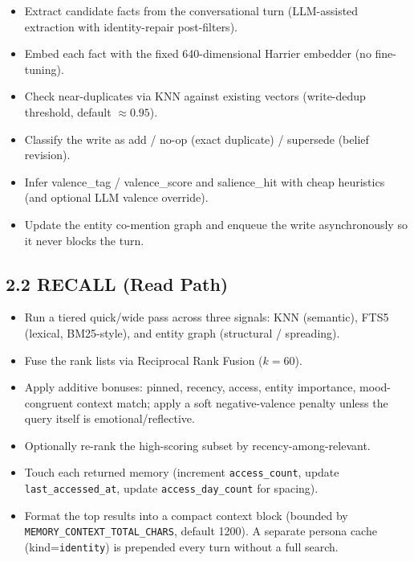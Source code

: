 \documentclass[]{article}
\begin{document}
\begin{itemize}
\item Extract candidate facts from the conversational turn (LLM-assisted
  extraction with identity-repair post-filters).
\item Embed each fact with the fixed 640-dimensional Harrier embedder
  (no fine-tuning).
\item Check near-duplicates via KNN against existing vectors (write-dedup
  threshold, default \(\approx 0.95\)).
\item Classify the write as add / no-op (exact duplicate) / supersede
  (belief revision).
\item Infer valence\_tag / valence\_score and salience\_hit with cheap
  heuristics (and optional LLM valence override).
\item Update the entity co-mention graph and enqueue the write
  asynchronously so it never blocks the turn.
\end{itemize}

\hypertarget{recall-read-path}{%
\subsection{\texorpdfstring{\textbf{2.2 RECALL (Read
Path)}}{2.2 RECALL (Read Path)}}\label{recall-read-path}}

\begin{itemize}
\item Run a tiered quick/wide pass across three signals: KNN (semantic),
  FTS5 (lexical, BM25-style), and entity graph (structural / spreading).
\item Fuse the rank lists via Reciprocal Rank Fusion (\(k=60\)).
\item Apply additive bonuses: pinned, recency, access, entity importance,
  mood-congruent context match; apply a soft negative-valence penalty
  unless the query itself is emotional/reflective.
\item Optionally re-rank the high-scoring subset by recency-among-relevant.
\item Touch each returned memory (increment \texttt{access\_count}, update
  \texttt{last\_accessed\_at}, update \texttt{access\_day\_count} for spacing).
\item Format the top results into a compact context block (bounded by
  \texttt{MEMORY\_CONTEXT\_TOTAL\_CHARS}, default 1200). A separate
  persona cache (kind=\texttt{identity}) is prepended every turn without
  a full search.
\end{itemize}
\end{document}

